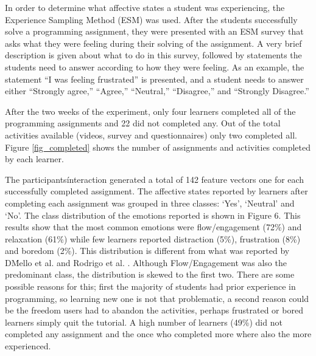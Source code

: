 \documentclass[a4paper,twoside]{article}
\begin{document}
In order to determine what affective states a student was experiencing, the
Experience Sampling Method (ESM) \cite{kubey1996experience} was used.
After the students successfully solve a programming assignment, they were presented
with an ESM survey that asks what they were feeling during their solving of the
assignment. A very brief description is given about what to do in this survey,
followed by statements the students need to answer according to how they were
feeling. As an example, the statement “I was feeling frustrated” is presented,
and a student needs to answer either “Strongly agree,” “Agree,” “Neutral,”
“Disagree,” and “Strongly Disagree.”

After the two weeks of the experiment, only four learners completed all of the
programming assignments and 22 did not completed any. Out of the total activities
available (videos, survey and questionnaires) only two completed all. Figure \ref{fig_completed}
shows the number of assignments and activities completed by each learner.

The participants\' interaction generated a total of 142 feature vectors one for each
successfully completed assignment. The affective states reported by learners after
completing each assignment was grouped in three classes: ‘Yes’, ‘Neutral’ and
‘No’. The class distribution of the emotions reported is shown in Figure 6. This
results show that the most common emotions were flow/engagement (72\%) and
relaxation (61\%) while few learners reported distraction (5\%), frustration
(8\%) and boredom (2\%). This distribution is different from what was reported
by D\'Mello et al. \cite{bixler2013detecting} and Rodrigo et al. \cite{rodrigo2009affective}.
Although Flow/Engagement was
also the predominant class, the distribution is skewed to the first two. There
are some possible reasons for this; first the majority of students had
prior experience in programming, so learning new one is not that problematic, a second
reason could be the freedom users had to abandon the activities, perhaps
frustrated or bored learners simply quit the tutorial. A high number of learners
(49\%) did not completed any assignment and the once who completed more where also
the more experienced.
\end{document}
